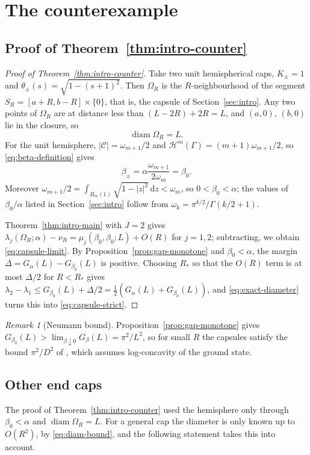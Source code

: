 \documentclass[11pt,a4paper]{article}
\numberwithin{equation}{section}
\theoremstyle{paperplain}
\theoremstyle{remark}
\newtheorem{remark}[theorem]{Remark}
\newcommand{\C}{\mathcal{C}}
\newcommand{\HH}{\mathcal{H}}
\newcommand{\dd}{\,\mathrm d}
\newcommand{\diam}{\operatorname{diam}}
\begin{document}
\section{The counterexample}\label{sec:capsule}

\subsection{Proof of Theorem~\ref{thm:intro-counter}}
\begin{proof}[Proof of Theorem~\ref{thm:intro-counter}]
Take two unit hemispherical caps, $K_\pm=1$ and
$\theta_\pm(s)=\sqrt{1-(s+1)^2}$. Then $\Omega_R$ is the $R$-neighbourhood
of the segment $S_R=[a+R,b-R]\times\{0\}$, that is, the capsule of
Section~\ref{sec:intro}. Any two points of $\Omega_R$ are at distance less
than $(L-2R)+2R=L$, and $(a,0)$, $(b,0)$ lie in the closure, so
\begin{equation}\label{eq:exact-diameter}
 \diam\Omega_R=L.
\end{equation}
For the unit hemisphere, $|\C|=\omega_{m+1}/2$ and
$\HH^m(\Gamma)=(m+1)\omega_{m+1}/2$, so \eqref{eq:beta-definition} gives
\[
 \beta_\pm=\alpha\frac{\omega_{m+1}}{2\omega_m}=\beta_0 .
\]
Moreover $\omega_{m+1}/2=\int_{B_m(1)}\sqrt{1-|z|^2}\dd z<\omega_m$, so
$0<\beta_0<\alpha$; the values of $\beta_0/\alpha$ listed in Section~\ref{sec:intro} follow from
$\omega_k=\pi^{k/2}/\Gamma(k/2+1)$.

Theorem~\ref{thm:intro-main} with $J=2$ gives
$\lambda_j(\Omega_R;\alpha)-\nu_R=\mu_j(\beta_0,\beta_0;L)+O(R)$ for $j=1,2$;
subtracting, we obtain \eqref{eq:capsule-limit}. By
Proposition~\ref{prop:gap-monotone} and $\beta_0<\alpha$, the margin
$\Delta=G_\alpha(L)-G_{\beta_0}(L)$ is positive. Choosing $R_*$ so that the
$O(R)$ term is at most $\Delta/2$ for $R<R_*$ gives
$\lambda_2-\lambda_1\le G_{\beta_0}(L)+\Delta/2=\frac12(G_\alpha(L)+G_{\beta_0}(L))$,
and \eqref{eq:exact-diameter} turns this into \eqref{eq:capsule-strict}.
\end{proof}

\begin{remark}[Neumann bound]\label{rem:neumann}
Proposition~\ref{prop:gap-monotone} gives
$G_{\beta_0}(L)>\lim_{\beta\downarrow0}G_\beta(L)=\pi^2/L^2$, so for small
$R$ the capsules satisfy the bound $\pi^2/D^2$ of \cite[Theorem~2.1]{ACH},
which assumes log-concavity of the ground state.
\end{remark}

\subsection{Other end caps}\label{sec:nearflat}
The proof of Theorem~\ref{thm:intro-counter} used the hemisphere only
through $\beta_0<\alpha$ and $\diam\Omega_R=L$. For a general cap the
diameter is only known up to $O(R^2)$, by \eqref{eq:diam-bound}, and the
following statement takes this into account.
\end{document}
